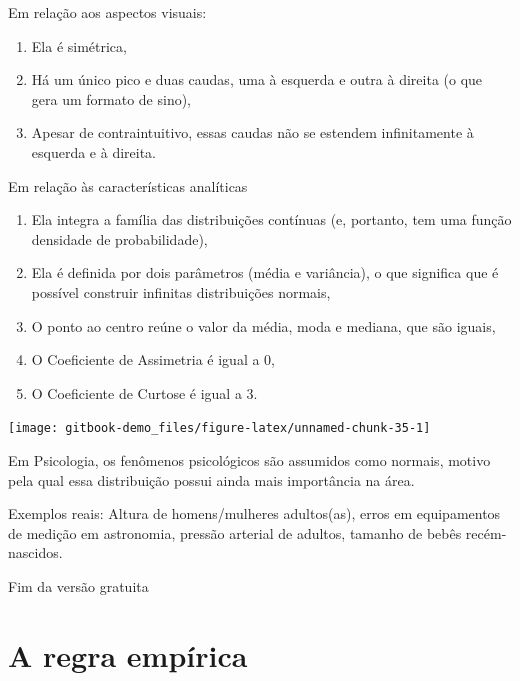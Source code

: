 \documentclass[
]{book}
\providecommand{\tightlist}{%
  \setlength{\itemsep}{0pt}\setlength{\parskip}{0pt}}
\begin{document}
Em relação aos aspectos visuais:

\begin{enumerate}
\def\labelenumi{\arabic{enumi})}
\tightlist
\item
  Ela é simétrica,\\
\item
  Há um único pico e duas caudas, uma à esquerda e outra à direita (o que gera um formato de sino),\\
\item
  Apesar de contraintuitivo, essas caudas não se estendem infinitamente à esquerda e à direita.
\end{enumerate}

Em relação às características analíticas

\begin{enumerate}
\def\labelenumi{\arabic{enumi})}
\tightlist
\item
  Ela integra a família das distribuições contínuas (e, portanto, tem uma função densidade de probabilidade),
\item
  Ela é definida por dois parâmetros (média e variância), o que significa que é possível construir infinitas distribuições normais,\\
\item
  O ponto ao centro reúne o valor da média, moda e mediana, que são iguais,\\
\item
  O Coeficiente de Assimetria é igual a 0,\\
\item
  O Coeficiente de Curtose é igual a 3.
\end{enumerate}

\begin{center}\texttt{[image: gitbook-demo\_files/figure-latex/unnamed-chunk-35-1]} \end{center}

Em Psicologia, os fenômenos psicológicos são assumidos como normais, motivo pela qual essa distribuição possui ainda mais importância na área.

Exemplos reais: Altura de homens/mulheres adultos(as), erros em equipamentos de medição em astronomia, pressão arterial de adultos, tamanho de bebês recém-nascidos.

Fim da versão gratuita

\hypertarget{a-regra-empuxedrica}{%
\section{A regra empírica}\label{a-regra-empuxedrica}}
\end{document}
